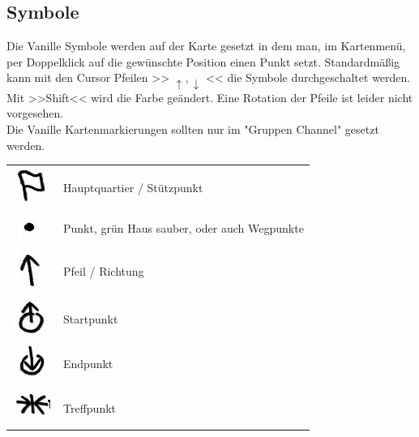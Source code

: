 \newpage

\subsection{Symbole}
	Die Vanille Symbole werden auf der Karte gesetzt in dem man, im Kartenmenü, per Doppelklick auf die gewünschte Position einen Punkt setzt. Standardmäßig kann mit den Cursor Pfeilen >> \begin{math} \uparrow,\downarrow \end{math} << die Symbole durchgeschaltet werden. Mit >>Shift<< wird die Farbe geändert. Eine Rotation der Pfeile ist leider nicht vorgesehen. \\
	Die Vanille Kartenmarkierungen sollten nur im "Gruppen Channel" gesetzt werden.

\begin{longtable}{p{3cm} p{15cm}}
	\includegraphics[scale=1]{./Grafiken/KarteUndMarkierungen/HQ.png}			& 		Hauptquartier / Stützpunkt \\
	\includegraphics[scale=1]{./Grafiken/KarteUndMarkierungen/Punkt.png}			&		Punkt, grün Haus sauber, oder auch Wegpunkte \\
	\includegraphics[scale=1]{./Grafiken/KarteUndMarkierungen/Pfeil.png}			&		Pfeil / Richtung \\
	\includegraphics[scale=1]{./Grafiken/KarteUndMarkierungen/Start.png}			&		Startpunkt \\
	\includegraphics[scale=1]{./Grafiken/KarteUndMarkierungen/Endpunkt.png}		&		Endpunkt \\
	\includegraphics[scale=1]{./Grafiken/KarteUndMarkierungen/Treffpunkt.png} 		&		Treffpunkt \\

\end{longtable}
